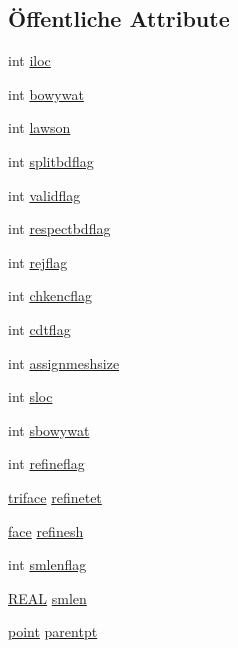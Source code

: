 \subsection*{Öffentliche Attribute}
\begin{DoxyCompactItemize}
\item 
int \hyperlink{classtetgenmesh_1_1insertvertexflags_a6d81dd1549cf9d39ce289d674ce68f45}{iloc}
\item 
int \hyperlink{classtetgenmesh_1_1insertvertexflags_a9b0fa5e802abd84a76e7e24c2dd448ac}{bowywat}
\item 
int \hyperlink{classtetgenmesh_1_1insertvertexflags_a932694f9cfa9b5a20d3ee632c5cb4f0b}{lawson}
\item 
int \hyperlink{classtetgenmesh_1_1insertvertexflags_a38c4259fdc1e73ee994d4bd424e32b2e}{splitbdflag}
\item 
int \hyperlink{classtetgenmesh_1_1insertvertexflags_a22ee846cb6922a83892692ed5a31c632}{validflag}
\item 
int \hyperlink{classtetgenmesh_1_1insertvertexflags_ae953afe4a3a59188b59fabe96cfe1d47}{respectbdflag}
\item 
int \hyperlink{classtetgenmesh_1_1insertvertexflags_af0c3e729085371144fd64069dc88d0ca}{rejflag}
\item 
int \hyperlink{classtetgenmesh_1_1insertvertexflags_a5751fba3e53f3be9d826f9fc96b180a4}{chkencflag}
\item 
int \hyperlink{classtetgenmesh_1_1insertvertexflags_a165eefd6dd465126f294084ef86a7a99}{cdtflag}
\item 
int \hyperlink{classtetgenmesh_1_1insertvertexflags_a1b944691a06ca5b9d27c9690732cea4a}{assignmeshsize}
\item 
int \hyperlink{classtetgenmesh_1_1insertvertexflags_abe0f4992169d636639d0f389a674a68f}{sloc}
\item 
int \hyperlink{classtetgenmesh_1_1insertvertexflags_a9d380c4151120f6d0008ee61a0f410d3}{sbowywat}
\item 
int \hyperlink{classtetgenmesh_1_1insertvertexflags_a13e91034cabc919adca3823de54de22d}{refineflag}
\item 
\hyperlink{classtetgenmesh_1_1triface}{triface} \hyperlink{classtetgenmesh_1_1insertvertexflags_ae8de017a73bd8cd9b6de4f67ae89e2c8}{refinetet}
\item 
\hyperlink{classtetgenmesh_1_1face}{face} \hyperlink{classtetgenmesh_1_1insertvertexflags_a5caa7334d56feac9a16021de6b8e2bea}{refinesh}
\item 
int \hyperlink{classtetgenmesh_1_1insertvertexflags_a3d626a15b8c3ed228ad1cf85e918f169}{smlenflag}
\item 
\hyperlink{tetgen_8h_a4b654506f18b8bfd61ad2a29a7e38c25}{R\-E\-A\-L} \hyperlink{classtetgenmesh_1_1insertvertexflags_aecaa1f8da0c8c7d073a4f3c0fbf1df56}{smlen}
\item 
\hyperlink{classtetgenmesh_ace3fb4f80389185b7c9b18ab69a3dea2}{point} \hyperlink{classtetgenmesh_1_1insertvertexflags_a7b72ad9649e1b63ed22bbf70e9b9d41a}{parentpt}
\end{DoxyCompactItemize}


